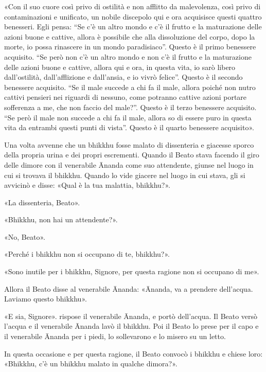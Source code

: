 «Con il suo cuore così privo di ostilità e non afflitto da malevolenza,
così privo di contaminazioni e unificato, un nobile discepolo qui e ora
acquisisce questi quattro benesseri. Egli pensa: “Se c’è un altro mondo
e c’è il frutto e la maturazione delle azioni buone e cattive, allora è
possibile che alla dissoluzione del corpo, dopo la morte, io possa
rinascere in un mondo paradisiaco”. Questo è il primo benessere
acquisito. “Se però non c’è un altro mondo e non c’è il frutto e la
maturazione delle azioni buone e cattive, allora qui e ora, in questa
vita, io sarò libero dall’ostilità, dall’afflizione e dall’ansia, e io
vivrò felice”. Questo è il secondo benessere acquisito. “Se il male
succede a chi fa il male, allora poiché non nutro cattivi pensieri nei
riguardi di nessuno, come potranno cattive azioni portare sofferenza a
me, che non faccio del male?”. Questo è il terzo benessere acquisito.
“Se però il male non succede a chi fa il male, allora so di essere puro
in questa vita da entrambi questi punti di vista”. Questo è il quarto
benessere acquisito».




Una volta avvenne che un bhikkhu fosse malato di dissenteria e giacesse
sporco della propria urina e dei propri escrementi. Quando il Beato
stava facendo il giro delle dimore con il venerabile Ānanda come suo
attendente, giunse nel luogo in cui si trovava il bhikkhu. Quando lo
vide giacere nel luogo in cui stava, gli si avvicinò e disse: «Qual è la
tua malattia, bhikkhu?».


«La dissenteria, Beato».


«Bhikkhu, non hai un attendente?».


«No, Beato».


«Perché i bhikkhu non si occupano di te, bhikkhu?».


«Sono inutile per i bhikkhu, Signore, per questa ragione non si occupano
di me».


Allora il Beato disse al venerabile Ānanda: «Ānanda, va a prendere
dell’acqua. Laviamo questo bhikkhu».


«E sia, Signore». rispose il venerabile Ānanda, e portò dell’acqua. Il
Beato versò l’acqua e il venerabile Ānanda lavò il bhikkhu. Poi il Beato
lo prese per il capo e il venerabile Ānanda per i piedi, lo sollevarono
e lo misero su un letto.


In questa occasione e per questa ragione, il Beato convocò i bhikkhu e
chiese loro: «Bhikkhu, c’è un bhikkhu malato in qualche dimora?».


